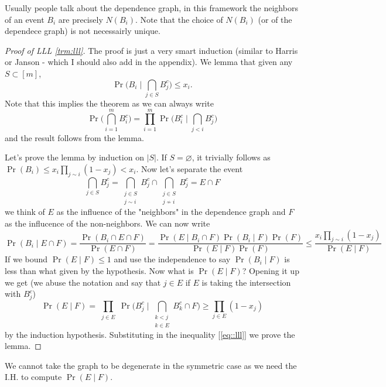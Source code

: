 \begin{remark}
	Usually people talk about the dependence graph, in this framework
	the neighbors of
	an event $B_i$ are precisely $N(B_i)$. Note that the choice of
	$N(B_i)$ (or of the dependece graph) is not necessairly unique.
\end{remark}

\begin{proof}[Proof of LLL \ref{trm:lll}]
	The proof is just a very smart induction (similar to Harris or
	Janson - which I should also add in the appendix).
	We lemma that given any $S \subset [m]$,
	\[
		\Pr\bigg(B_i \mid \bigcap_{j \in S} B_j^c \bigg) \leq x_i.
	\]
	Note that this implies the theorem as we can always write
	\[
		\Pr\bigg(\bigcap_{i = 1}^m B_i^c\bigg) = \prod_{i = 1}^m
		\Pr\bigg(B_i^c \mid \bigcap_{j < i} B_j^c\bigg)
	\]
	and the result follows from the lemma.

	Let's prove the lemma by induction on $|S|$. If $S = \varnothing$,
	it trivially follows as
	$\Pr(B_i) \leq x_i \prod_{j \sim i}(1-x_j) < x_i$. Now let's separate the event
	\[\bigcap_{j \in S} B_j^c  = \bigcap_{\substack{j \in S\\j \sim i}}
	B_j^c \cap \bigcap_{\substack{j \in S\\j \not \sim i}} B_j^c  = E \cap F\]
	we think of $E$ as the influence of the "neighbors" in the
	dependence graph and $F$ as the influcence of the non-neighbors.
	We can now write
	\begin{equation}
		\label{eq::lll}
		\Pr(B_i \mid E \cap F) = \frac{\Pr(B_i \cap E \cap F)}{\Pr(E \cap F)} =
		\frac{\Pr(E \mid B_i \cap F)\Pr(B_i \mid F)\Pr(F)}{\Pr(E \mid F) \Pr(F)} \leq
		\frac{x_i\prod_{j \sim i}(1-x_j)}{\Pr(E \mid F)}
	\end{equation}
	If we bound $\Pr(E \mid F) \leq 1$ and use the independence to say
	$\Pr(B_i \mid F)$ is less than what given by the hypothesis.
	Now what is $\Pr(E \mid F)$? Opening it up we get (we abuse the
	notation and say that $j \in E$ if $E$ is taking the intersection with $B_j^c$)
	\[
		\Pr(E \mid F) = \prod_{\substack{j \in E}} \Pr\bigg(B_j^c \mid
		\bigcap_{\substack{k < j\\k \in E}}B_k^c \cap F\bigg) \geq \prod_{j
		\in E} (1-x_j)
	\]
	by the induction hypothesis. Substituting in the inequality
	[\ref{eq::lll}] we prove the lemma.
\end{proof}

\begin{remark}
	We cannot take the graph to be degenerate in the symmetric case as
	we need the I.H. to compute $\Pr(E \mid F)$.
\end{remark}


